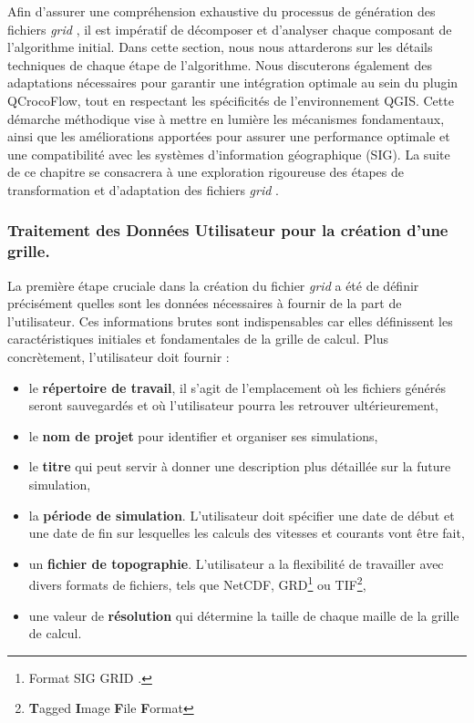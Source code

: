 Afin d'assurer une compréhension exhaustive du processus de génération des fichiers \og \textit{grid} \fg{}, il est impératif de décomposer et d'analyser chaque composant de l'algorithme initial. Dans cette section, nous nous attarderons sur les détails techniques de chaque étape de l'algorithme. Nous discuterons également des adaptations nécessaires pour garantir une intégration optimale au sein du plugin QCrocoFlow, tout en respectant les spécificités de l'environnement QGIS. Cette démarche méthodique vise à mettre en lumière les mécanismes fondamentaux, ainsi que les améliorations apportées pour assurer une performance optimale et une compatibilité avec les systèmes d'information géographique (SIG). La suite de ce chapitre se consacrera à une exploration rigoureuse des étapes de transformation et d'adaptation des fichiers \og \textit{grid} \fg{}.

\subsubsection{Traitement des Données Utilisateur pour la création d'une grille.}
\label{subsub:gridcreation}

La première étape cruciale dans la création du fichier \og \textit{grid} \fg{} a été de définir précisément quelles sont les données nécessaires à fournir de la part de l'utilisateur. Ces informations brutes sont indispensables car elles définissent les caractéristiques initiales et fondamentales de la grille de calcul. Plus concrètement, l'utilisateur doit fournir :

\begin{itemize}
	\item le \textbf{répertoire de travail}, il s'agit de l'emplacement où les fichiers générés seront sauvegardés et où l'utilisateur pourra les retrouver ultérieurement,
	\item le \textbf{nom de projet} pour identifier et organiser ses simulations,
	\item le \textbf{titre} qui peut servir à donner une description plus détaillée sur la future simulation,
	\item la \textbf{période de simulation}. L'utilisateur doit spécifier une date de début et une date de fin sur lesquelles les calculs des vitesses et courants vont être fait,
	\item un \textbf{fichier de topographie}. L'utilisateur a la flexibilité de travailler avec divers formats de fichiers, tels que NetCDF, GRD\footnote{Format SIG \og GRID \fg{}.} ou TIF\footnote{\og \textbf{T}agged \textbf{I}mage \textbf{F}ile \textbf{F}ormat \fg{}},
	\item une valeur de \textbf{résolution} qui détermine la taille de chaque maille de la grille de calcul.
\end{itemize}

